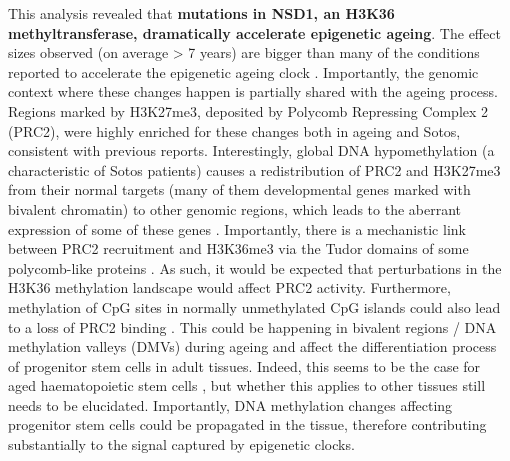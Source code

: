 This analysis revealed that \textbf{mutations in NSD1, an H3K36 methyltransferase, dramatically accelerate epigenetic ageing}. The effect sizes observed (on average > 7 years) are bigger than many of the conditions reported to accelerate the epigenetic ageing clock \citep{Horvath2018}. Importantly, the genomic context where these changes happen is partially shared with the ageing process. Regions marked by H3K27me3, deposited by Polycomb Repressing Complex 2 (\acrshort{PRC2}), were highly enriched for these changes both in ageing and Sotos, consistent with previous reports. Interestingly, global DNA hypomethylation (a characteristic of Sotos patients) causes a redistribution of \acrshort{PRC2} and H3K27me3 from their normal targets (many of them developmental genes marked with bivalent chromatin) to other genomic regions, which leads to the aberrant expression of some of these genes \citep{Reddington2013}. Importantly, there is a mechanistic link between PRC2 recruitment and H3K36me3 via the Tudor domains of some polycomb-like proteins \citep{Cai2013,Li2017}. As such, it would be expected that perturbations in the H3K36 methylation landscape would affect PRC2 activity. Furthermore, methylation of CpG sites in normally unmethylated CpG islands could also lead to a loss of PRC2 binding \citep{Li2017}. This could be happening in bivalent regions / DNA methylation valleys (\acrshort{DMV}s) during ageing and affect the differentiation process of progenitor stem cells in adult tissues. Indeed, this seems to be the case for aged haematopoietic stem cells \citep{Sun2014x,Beerman2013}, but whether this applies to other tissues still needs to be elucidated. Importantly, DNA methylation changes affecting progenitor stem cells could be propagated in the tissue, therefore contributing substantially to the signal captured by epigenetic clocks. 

\bigskip

